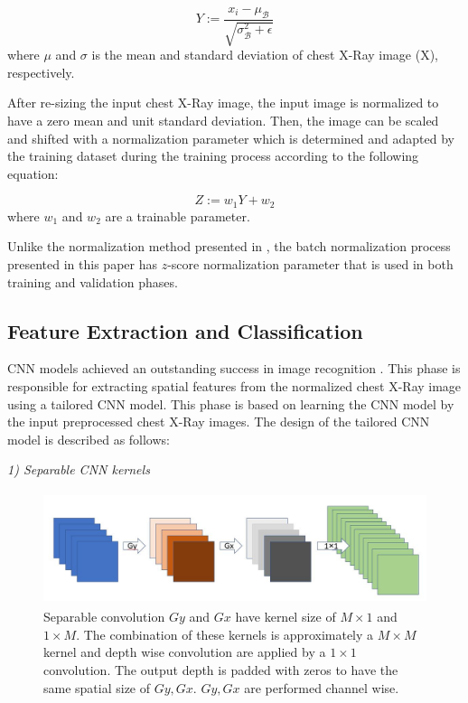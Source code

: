 \begin{equation}
Y := \frac{x_i - \mu_{\mathcal B}}{\sqrt{\sigma_{\mathcal B}^2 + \epsilon}}
\label{eq1}
\end{equation}
where $\mu$ and $\sigma$ is the mean  and standard deviation of chest X-Ray image (X), respectively.

After re-sizing the input chest X-Ray image, the input image is normalized to have a zero mean and unit standard deviation. Then,  the image can be scaled and shifted with a normalization parameter which is determined and adapted by the training dataset during the training process according to the following equation: 

\begin{equation}
Z := w_1 Y + w_2
\label{eq2}
\end{equation}
where $w_1$ and $w_2$ are a trainable parameter.

Unlike the  normalization method presented in \cite{ioffe2015batch}, the batch normalization process presented in this paper has $z$-score normalization parameter that is used in both training and validation phases.


\subsection{Feature Extraction and Classification}

CNN models achieved an outstanding success in image recognition \cite{lecun2015deep}. This phase  is responsible for extracting spatial features from the normalized chest X-Ray image using a tailored CNN model.  This phase is based on learning the CNN model by the input preprocessed chest X-Ray images. The design of the tailored CNN model is described as follows: 

\textit{1) Separable CNN kernels}
\begin{figure}
\begin{center}
\includegraphics[height=33mm,width=14.0cm]{Figures/fig2.jpg}
\caption{Separable convolution  $Gy$ and $Gx$ have kernel size of $M\times1$ and $1 \times M$. The combination of these kernels is approximately a $M\times M$ kernel  and depth wise convolution are applied by a $1\times1$ convolution. The output depth  is padded with zeros to have the same spatial size of  $Gy, Gx$. $Gy, Gx$ are performed channel wise. }
\label{fig2}
\end{center}

\end{figure}


